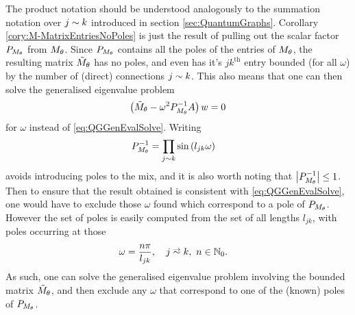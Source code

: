 The product notation should be understood analogously to the summation notation over $j\sim k$ introduced in section \ref{sec:QuantumGraphs}.
Corollary \ref{cory:M-MatrixEntriesNoPoles} is just the result of pulling out the scalar factor $P_{M_\theta}$ from $M_\theta$.
Since $P_{M_\theta}$ contains all the poles of the entries of $M_\theta$, the resulting matrix $\tilde{M}_\theta$ has no poles, and even has it's $jk^{\mathrm{th}}$ entry bounded (for all $\omega$) by the number of (direct) connections $j\sim k$.
This also means that one can then solve the generalised eigenvalue problem
\begin{align} \label{eq:QGGenEvalSolveNoPoles}
	\left(  \tilde{M}_\theta - \omega^2 P_{M_\theta}^{-1} A \right)w = 0
\end{align}
for $\omega$ instead of \eqref{eq:QGGenEvalSolve}.
Writing
\begin{align*}
	P_{M_\theta}^{-1} &= \prod_{j\sim k}\sin\left( l_{jk}\omega \right)
\end{align*}
avoids introducing poles to the mix, and it is also worth noting that $\left\lvert P_{M_\theta}^{-1} \right\rvert\leq 1$.
Then to ensure that the result obtained is consistent with \eqref{eq:QGGenEvalSolve}, one would have to exclude those $\omega$ found which correspond to a pole of $P_{M_\theta}$.
However the set of poles is easily computed from the set of all lengths $l_{jk}$, with poles occurring at those
\begin{align*}
	\omega &= \frac{n\pi}{l_{jk}}, \quad j\conLeft k, \ n\in\naturals_{0}.
\end{align*}
As such, one can solve the generalised eigenvalue problem involving the bounded matrix $\tilde{M}_\theta$, and then exclude any $\omega$ that correspond to one of the (known) poles of $P_{M_\theta}$. \newline

